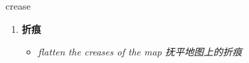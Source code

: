 
\begin{frame}
{\huge crease}
\begin{center}
\begin{enumerate}\Large
  \item \textbf{折痕}
  \begin{itemize}
    \item \em{\Large{flatten the creases of the map 抚平地图上的折痕}}
  \end{itemize}
\end{enumerate}
\end{center}
\end{frame}
